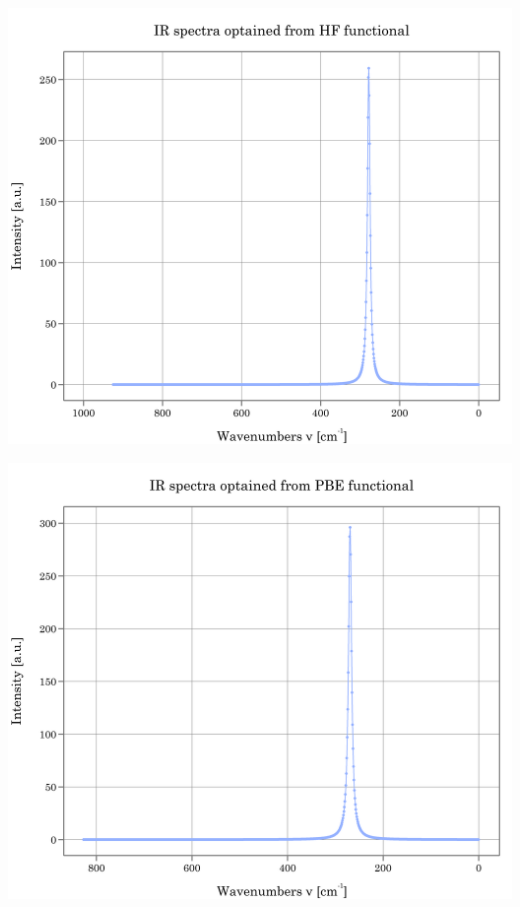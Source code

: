 \documentclass{article}
\begin{document}
\noindent\begin{minipage}{0.45\textwidth}
	\centering
	\includegraphics[width=1\textwidth]{../images/IR/IR_HF.png}
	\label{fig:VIBRATIONAL_HF}
\end{minipage}
\hfill
\begin{minipage}{0.45\textwidth}
	\centering
	\includegraphics[width=1\textwidth]{../images/IR/IR_PBE.png}
	\label{fig:VIBRATIONAL_PBE}
\end{minipage}
\end{document}
